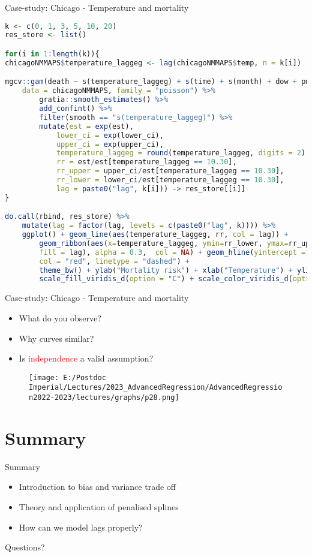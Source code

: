 \documentclass{beamer}
\begin{document}
\begin{frame}[fragile]{Case-study: Chicago - Temperature and mortality}
	\begin{lstlisting}[language=R, basicstyle=\tiny]
k <- c(0, 1, 3, 5, 10, 20)
res_store <- list()

for(i in 1:length(k)){
chicagoNMMAPS$temperature_laggeg <- lag(chicagoNMMAPS$temp, n = k[i])

mgcv::gam(death ~ s(temperature_laggeg) + s(time) + s(month) + dow + pm10, 
	data = chicagoNMMAPS, family = "poisson") %>% 
		gratia::smooth_estimates() %>%
		add_confint() %>% 
		filter(smooth == "s(temperature_laggeg)") %>% 
		mutate(est = exp(est), 
			lower_ci = exp(lower_ci), 
			upper_ci = exp(upper_ci), 
			temperature_laggeg = round(temperature_laggeg, digits = 2),
			rr = est/est[temperature_laggeg == 10.30], 
			rr_upper = upper_ci/est[temperature_laggeg == 10.30], 
			rr_lower = lower_ci/est[temperature_laggeg == 10.30], 
			lag = paste0("lag", k[i])) -> res_store[[i]]
}

do.call(rbind, res_store) %>% 
	mutate(lag = factor(lag, levels = c(paste0("lag", k)))) %>% 
	ggplot() + geom_line(aes(temperature_laggeg, rr, col = lag)) + 
		geom_ribbon(aes(x=temperature_laggeg, ymin=rr_lower, ymax=rr_upper, 
		fill = lag), alpha = 0.3,  col = NA) + geom_hline(yintercept = 1, 
		col = "red", linetype = "dashed") + 
		theme_bw() + ylab("Mortality risk") + xlab("Temperature") + ylim(c(0.7, 1.7)) + 
		scale_fill_viridis_d(option = "C") + scale_color_viridis_d(option = "C")
	\end{lstlisting}
	
\end{frame}



\begin{frame}[fragile]{Case-study: Chicago - Temperature and mortality}
	\begin{itemize}
		\item What do you observe?
		\item Why curves similar?
		\item Is \textcolor{red}{independence} a valid assumption?
	\end{itemize}
		\begin{figure}
		\texttt{[image: E:/Postdoc Imperial/Lectures/2023\_AdvancedRegression/AdvancedRegression2022-2023/lectures/graphs/p28.png]}
	\end{figure}
\end{frame}

\section{Summary}
\begin{frame}{Summary}
	\begin{itemize}
		\item Introduction to bias and variance trade off
		\item Theory and application of penalised splines
		\item How can we model lags properly?
	\end{itemize}
	Questions?
\end{frame}
\end{document}
